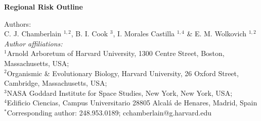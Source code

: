 \documentclass{article}\usepackage[]{graphicx}\usepackage[]{color}
\begin{document}
\noindent \textbf{\Large{Regional Risk Outline}}

\noindent Authors:\\
C. J. Chamberlain $^{1,2}$, B. I. Cook $^{3}$, I. Morales Castilla $^{1,4}$ \& E. M. Wolkovich $^{1,2}$
\vspace{2ex}\\
\emph{Author affiliations:}\\
$^{1}$Arnold Arboretum of Harvard University, 1300 Centre Street, Boston, Massachusetts, USA; \\
$^{2}$Organismic \& Evolutionary Biology, Harvard University, 26 Oxford Street, Cambridge, Massachusetts, USA; \\
$^{3}$NASA Goddard Institute for Space Studies, New York, New York, USA; \\
$^{4}$Edificio Ciencias, Campus Universitario 28805 Alcalá de Henares, Madrid, Spain \\
\vspace{2ex}
$^*$Corresponding author: 248.953.0189; cchamberlain@g.harvard.edu\\

\renewcommand{\thetable}{\arabic{table}}
\renewcommand{\thefigure}{\arabic{figure}}
\renewcommand{\labelitemi}{$-$}

\end{document}
